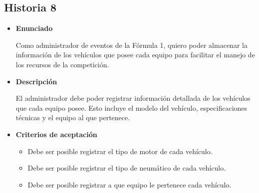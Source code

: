 \documentclass{article}
\begin{document}
	\subsection{Historia 8}
	\begin{itemize}
		
		\item \large{\textbf{Enunciado}}
		\begin{description}
Como administrador de eventos de la Fórmula 1, quiero poder almacenar la información de los vehículos que posee cada equipo para facilitar el manejo de los recursos de la competición.

		\end{description}
		
		\item \large{\textbf{Descripción}}
		\begin{description}
El administrador debe poder registrar información detallada de los vehículos que cada equipo posee. Esto incluye el modelo del vehículo, especificaciones técnicas y el equipo al que pertenece. 

		\end{description}
		
		\item \large{\textbf{Criterios de aceptación}}
		\begin{itemize}
			\item Debe ser posible registrar el tipo de motor de cada vehículo. 
			\item Debe ser posible registrar el tipo de neumático de cada vehículo. 
			\item Debe ser posible registrar a que equipo le pertenece cada vehículo. 
			
		\end{itemize}
		
	\end{itemize}
	
\end{document}

